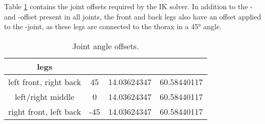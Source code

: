 Table \ref{table:Joint position offsets} contains the joint offsets required by the IK solver. 
 In addition to the \textbeta- and \textgamma-offset present in all joints, the front and back legs also have an offset applied to the \textalpha-joint, as these legs are connected to the thorax in a 45° angle.

{\def\arraystretch{1.4}\tabcolsep=5pt
	\begin{table}
		\centering
		\begin{tabular}{| c | c | c | c |} 
			\hline
			\textbf{legs}& \textbf{\textalpha} & \textbf{\textbeta} & \textbf{\textgamma} \\ [0.5ex] 
			\hline
			\hline
			left front, right back & 45 & 14.03624347 & 60.58440117  \\ 
			
			left/right middle & 0 & 14.03624347 & 60.58440117 \\
			
			right front, left back & -45 & 14.03624347 & 60.58440117 \\
			\hline
		\end{tabular}
		\caption[Joint position offsets]{Joint angle offsets.}
		\label{table:Joint position offsets}
	\end{table}
}





